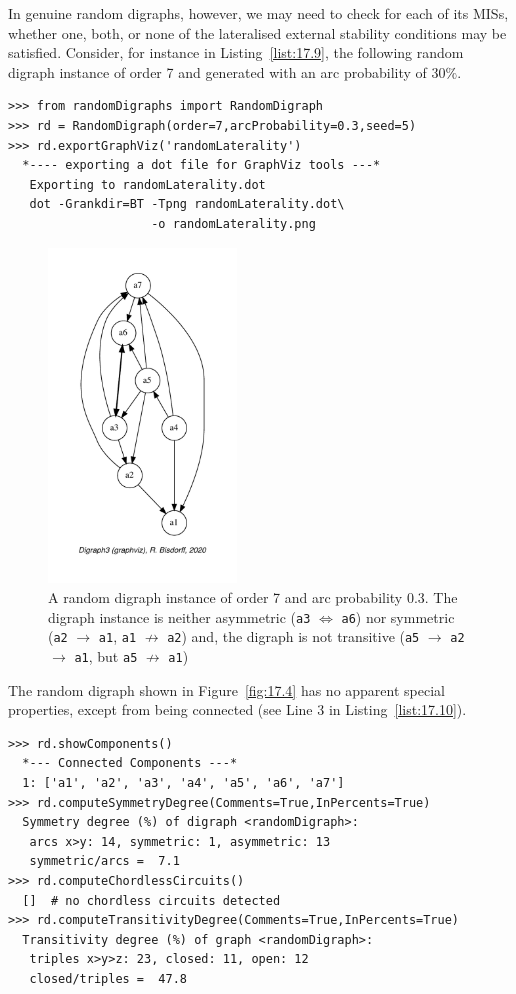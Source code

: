 In genuine random digraphs, however, we may need to check for each of its MISs, whether one, both, or none of the lateralised external stability conditions may be satisfied. Consider, for instance in Listing~\vref{list:17.9}, the following random digraph instance of order 7 and generated with an arc probability of $30\%$. 
\begin{lstlisting}[caption={Generating a random digraph \texttt{rd} of order 7 and arc probability 0.3},label=list:17.9]
>>> from randomDigraphs import RandomDigraph
>>> rd = RandomDigraph(order=7,arcProbability=0.3,seed=5)
>>> rd.exportGraphViz('randomLaterality')
  *---- exporting a dot file for GraphViz tools ---*
   Exporting to randomLaterality.dot
   dot -Grankdir=BT -Tpng randomLaterality.dot\
                    -o randomLaterality.png
\end{lstlisting}
\begin{figure}[ht]
\sidecaption[t]
\includegraphics[width=5cm]{Figures/17-4-randomLaterality.pdf}
\caption{A random digraph instance of order 7 and arc probability 0.3. The digraph instance is neither asymmetric (\texttt{a3} $\Leftrightarrow$ \texttt{a6}) nor symmetric (\texttt{a2} $\rightarrow$ \texttt{a1}, \texttt{a1} $\not\rightarrow$ \texttt{a2}) and, the digraph is not transitive (\texttt{a5} $\rightarrow$ \texttt{a2} $\rightarrow$ \texttt{a1}, but \texttt{a5} $\not\rightarrow$ \texttt{a1})} 
\label{fig:17.4}       %
\end{figure}

The random digraph shown in Figure~\vref{fig:17.4} has no apparent special properties, except from being connected (see Line 3 in Listing~\vref{list:17.10}).
\begin{lstlisting}[caption={Inspecting the properties of random digraph \texttt{rd}},label=list:17.10]
>>> rd.showComponents()
  *--- Connected Components ---*
  1: ['a1', 'a2', 'a3', 'a4', 'a5', 'a6', 'a7']
>>> rd.computeSymmetryDegree(Comments=True,InPercents=True)
  Symmetry degree (%) of digraph <randomDigraph>:
   arcs x>y: 14, symmetric: 1, asymmetric: 13
   symmetric/arcs =  7.1
>>> rd.computeChordlessCircuits()
  []  # no chordless circuits detected
>>> rd.computeTransitivityDegree(Comments=True,InPercents=True)
  Transitivity degree (%) of graph <randomDigraph>:
   triples x>y>z: 23, closed: 11, open: 12
   closed/triples =  47.8
\end{lstlisting}

